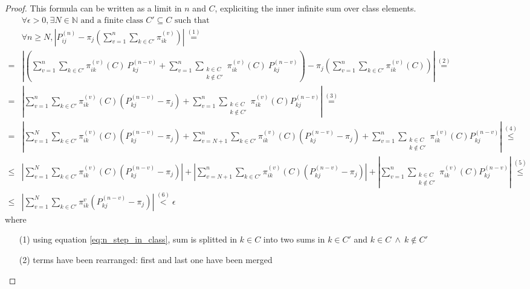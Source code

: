 \begin{proof}
		This formula can be written as a limit in $n$ and $C$, expliciting the inner infinite sum over class elements.
		\begin{equation}\begin{split} \label{eq:theorem_3.1_first term}
			& \forall \epsilon > 0, \exists N \in \mathbb{N} \text{ and a finite class } C' \subseteq C \text{ such that } \\
			& \forall n \ge N, \left| P_{ij}^{(n)} - \pi_j \left( \sum_{v = 1}^{n} \sum_{k \in C'} \pi_{ik}^{(v)} \right) \right| \stackrel{(1)}{=}
			\\
			= & \left|
				\left(
					\sum_{v = 1}^{n} \sum_{k \in C'} \pi_{ik}^{(v)}(C) ~ P_{kj}^{(n-v)} + \sum_{v = 1}^{n} \sum_{\substack{k \in C \\ k \notin C'}} \pi_{ik}^{(v)}(C) ~ P_{kj}^{(n-v)} \right)
				- \pi_j \left( \sum_{v = 1}^{n} \sum_{k \in C'} \pi_{ik}^{(v)}(C) \right)
				\right| \stackrel{(2)}{=}
			\\
			= & \left| \sum_{v = 1}^{n} \sum_{k \in C'} \pi_{ik}^{(v)}(C) (P_{kj}^{(n-v)} - \pi_j)
				+ \sum_{v = 1}^{n} \sum_{\substack{k \in C \\ k \notin C'}} \pi_{ik}^{(v)}(C) P_{kj}^{(n-v)} \right| \stackrel{(3)}{=}
			\\
			= & \left| \sum_{v = 1}^{N} \sum_{k \in C'} \pi_{ik}^{(v)}(C) (P_{kj}^{(n-v)} - \pi_j) +
				\sum_{v = N+1}^{n} \sum_{k \in C'} \pi_{ik}^{(v)}(C) (P_{kj}^{(n-v)} - \pi_j) +
				\sum_{v = 1}^{n} \sum_{\substack{k \in C \\ k \notin C'}} \pi_{ik}^{(v)}(C) P_{kj}^{(n-v)} \right| \stackrel{(4)}{\le}
			\\
			\le & \left| \sum_{v = 1}^{N} \sum_{k \in C'} \pi_{ik}^{(v)}(C) (P_{kj}^{(n-v)} - \pi_j) \right| +
				\left| \sum_{v = N+1}^{n} \sum_{k \in C'} \pi_{ik}^{(v)}(C) (P_{kj}^{(n-v)} - \pi_j) \right| +
				\left| \sum_{v = 1}^{n} \sum_{\substack{k \in C \\ k \notin C'}} \pi_{ik}^{(v)}(C) P_{kj}^{(n-v)} \right| \stackrel{(5)}{\le}
			\\
			\le & \left| \sum_{v = 1}^{N} \sum_{k \in C'} \pi_{ik}^v (P_{kj}^{(n-v)} - \pi_j) \right| \stackrel{(6)}{<} \epsilon
		\end{split}\end{equation}
		where
		\begin{itemize}
			\item [(1)] using equation \ref{eq:n_step_in_class}, sum is splitted in $k \in C$ into two sums in $k \in C'$ and $k \in C ~ \wedge ~ k \notin C' $
			\item [(2)] terms have been rearranged: first and last one have been merged

\end{itemize}
\end{proof}
